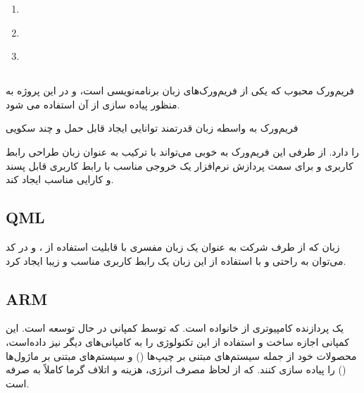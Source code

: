\documentclass[a4paper,12pt]{report}
\begin{document}
	\begin{enumerate}[nosep]
		\item
			\hyperref[subsec1:sec5:chap1]{}
		\item
			\hyperref[subsec2:sec5:chap1]{}
		\item
			\hyperref[subsec3:sec5:chap1]{}
	\end{enumerate}

	\subsection{}\label{subsec1:sec5:chap1}
		فریم‌ورک
		محبوب
		که یکی از فریم‌ورک‌های زبان برنامه‌نویسی
		است، و در این پروژه به منظور پیاده سازی
		از آن استفاده می شود.

		فریم‌ورک
		به واسطه زبان قدرتمند
		توانایی ایجاد
		قابل حمل و چند سکویی

		را دارد.
		از طرفی این فریم‌ورک به خوبی می‌تواند با ترکیب
		به عنوان زبان طراحی رابط کاربری و
		برای سمت پردازش نرم‌افزار یک خروجی مناسب با رابط کاربری قابل پسند و کارایی مناسب ایجاد کند.
	\subsection{QML}\label{subsec2:sec5:chap1}
	زبان
	که از طرف شرکت
	به عنوان یک زبان مفسری با قابلیت استفاده از
	،
	و
	در کد می‌توان به راحتی و با استفاده از این زبان یک رابط کاربری مناسب و زیبا ایجاد کرد.
	\cite{QtQML51548:online}
	\subsection{ARM}\label{subsec3:sec5:chap1}
	یک پردازنده کامپیوتری از خانواده
	است. که توسط کمپانی
	در حال توسعه است.
	این کمپانی اجازه ساخت و استفاده از این تکنولوژی را به کامپانی‌های دیگر نیز داده‌است،‌ محصولات خود از جمله سیستم‌های مبتنی بر چیپ‌ها
	()
	و سیستم‌های مبتنی بر ماژول‌ها
	()
	را پیاده سازی کنند. که از لحاظ مصرف انرژی، هزینه و اتلاف گرما کاملاً به صرفه است.
\end{document}
